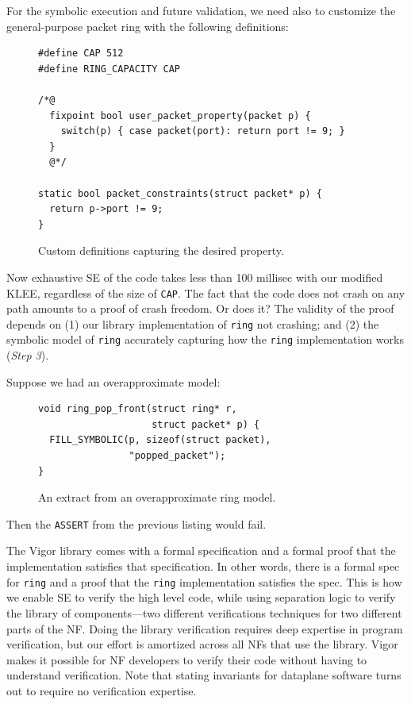 \documentclass[letterpaper,twocolumn,10pt]{article}
\newcommand{\code}[1]{\lstinline{#1}}
\begin{document}
For the symbolic execution and future validation, we need also to customize the
general-purpose packet ring with the following definitions:

\begin{figure}
\begin{lstlisting}
#define CAP 512
#define RING_CAPACITY CAP

/*@
  fixpoint bool user_packet_property(packet p) {
    switch(p) { case packet(port): return port != 9; }
  }
  @*/

static bool packet_constraints(struct packet* p) {
  return p->port != 9;
}
\end{lstlisting}
  \caption{Custom definitions capturing the desired property.}
  \label{lst:customizations}
\end{figure}

Now exhaustive SE of the code takes less than 100 millisec with our modified
KLEE, regardless of the size of \code{CAP}.  The fact that the code does not
crash on any path amounts to a proof of crash freedom. Or does it? The validity
of the proof depends on (1)  our library implementation of \code{ring} not
crashing; and (2) the symbolic model of \code{ring} accurately capturing how the
\code{ring} implementation works ({\em Step 3}).

Suppose we had an overapproximate model:
\begin{figure}[h!]
\begin{lstlisting}
void ring_pop_front(struct ring* r,
                    struct packet* p) {
  FILL_SYMBOLIC(p, sizeof(struct packet),
                "popped_packet");
}
\end{lstlisting}
  \caption{An extract from an overapproximate ring model.}
  \label{lst:overapproximate}
\end{figure}
Then the \code{ASSERT} from the previous listing would fail.

The Vigor library comes with a formal specification and a formal proof that the implementation satisfies that specification. In other words, there is a formal spec for \code{ring} and a proof that the \code{ring} implementation satisfies the spec. This is how we enable SE to verify the high level code, while using separation logic to verify the library of components---two different verifications techniques for two different parts of the NF. Doing the library verification requires deep expertise in program verification, but our effort is amortized across all NFs that use the library. Vigor makes it possible for NF developers to verify their code without having to understand verification. Note that stating invariants for dataplane software turns out to require no verification expertise.
\end{document}
